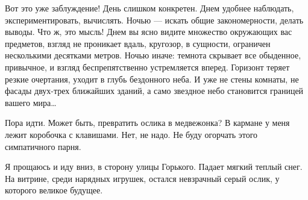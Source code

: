    Вот это уже заблуждение! День  слишком конкретен. Днем удобнее  наблюдать,
   экспериментировать, вычислять. Ночью — искать общие закономерности, делать
   выводы. Что ж,  это мысль! Днем  вы ясно видите  множество окружающих  вас
   предметов, взгляд  не проникает  вдаль,  кругозор, в  сущности,  ограничен
   несколькими десятками метров. Ночью иначе: темнота скрывает все обыденное,
   привычное, и взгляд беспрепятственно устремляется вперед. Горизонт  теряет
   резкие очертания, уходит в глубь бездонного неба. И уже не стены  комнаты,
   не фасады  двух-трех ближайших  зданий, а  само звездное  небо  становится
   границей вашего мира…

   Пора идти. Может быть,  превратить ослика в медвежонка?  В кармане у  меня
   лежит коробочка  с  клавишами.  Нет,  не  надо.  Не  буду  огорчать  этого
   симпатичного парня.

Я прощаюсь и иду вниз, в  сторону улицы Горького. Падает мягкий теплый
снег.  На витрине,  среди нарядных  игрушек, остался  невзрачный серый
ослик, у которого великое будущее.
